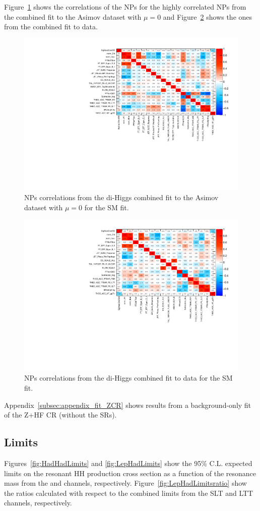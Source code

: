 Figure~\ref{fig:CombinedNPCorrelationsAsimov} shows the correlations of the NPs for the highly correlated NPs from the combined fit to the Asimov dataset with $\mu=0$ and Figure~\ref{fig:CombinedNPCorrelationsData} shows the ones from the combined fit to data.

\begin{figure}
\centering
\includegraphics[width=.45\textwidth]{figures/results/HH/Combined/corr_HighCorrNoMCStat_Asimov_SM.pdf}
\caption{NPs correlations from the di-Higgs combined fit to the Asimov dataset with $\mu=0$ for the SM fit.}
\label{fig:CombinedNPCorrelationsAsimov}
\end{figure}

\begin{figure}
\centering
\includegraphics[width=.45\textwidth]{figures/results/HH/Combined/corr_HighCorrNoMCStat_Data_SM.pdf}
\caption{NPs correlations from the di-Higgs combined fit to data for the SM fit.}
\label{fig:CombinedNPCorrelationsData}
\end{figure}


Appendix~\ref{subsec:appendix_fit_ZCR} shows results from a background-only fit of the Z+HF CR (without the SRs).


\subsection{Limits}

Figures~\ref{fig:HadHadLimits} and \ref{fig:LepHadLimits} show the 95\% C.L. expected limits on the resonant HH production cross section as a function of the resonance mass from the \hadhad and \lephad channels, respectively. 
Figure~\ref{fig:LepHadLimitsratio} show the ratios calculated with respect to the \lephad
combined limits from the SLT and LTT channels, respectively.


